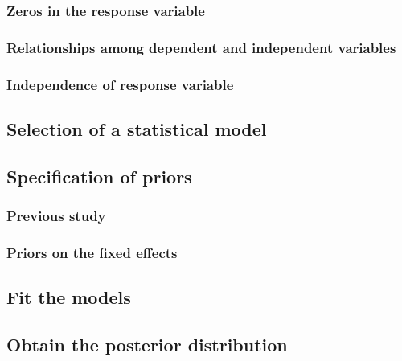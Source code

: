 \documentclass[
]{book}
\begin{document}
\hypertarget{nb-zeros}{%
\subsubsection{Zeros in the response variable}\label{nb-zeros}}

\hypertarget{nb-rels}{%
\subsubsection{Relationships among dependent and independent
variables}\label{nb-rels}}

\hypertarget{nb-indep}{%
\subsubsection{Independence of response variable}\label{nb-indep}}

\hypertarget{nb-select}{%
\subsection{Selection of a statistical model}\label{nb-select}}

\hypertarget{nb-prior-spec}{%
\subsection{Specification of priors}\label{nb-prior-spec}}

\hypertarget{previous-study}{%
\subsubsection{Previous study}\label{previous-study}}

\hypertarget{nb-priors-fixed}{%
\subsubsection{Priors on the fixed effects}\label{nb-priors-fixed}}

\hypertarget{nb-fit-models}{%
\subsection{Fit the models}\label{nb-fit-models}}

\hypertarget{nb-post-dist}{%
\subsection{Obtain the posterior distribution}\label{nb-post-dist}}
\end{document}
